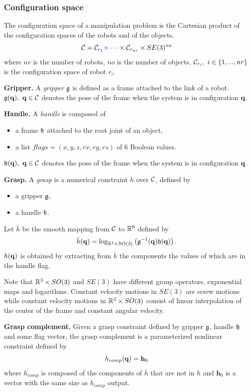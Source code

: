 \subsubsection{Configuration space} The configuration space of a manipulation problem is the Cartesian product of the configuration spaces of the robots and of the objects.
$$
\mathcal{C} = \mathcal{C}_{r_1}{\color{blue}\times\cdots}\times\mathcal{C}_{r_{nr}}\times SE(3)^{no}
$$
where $nr$ is the number of robots, $no$ is the number of objects, $\CS_{r_i},\ i\in\{1,...,nr\}$ is the configuration space of robot $r_i$.
\begin{definition}\textbf{Gripper.}\label{def:gripper}
  A \emph{gripper} $\mathfrak{g}$ is defined as a frame attached to the link of a robot. $\gripper(\conf),\ \conf\in\CS$ denotes the pose of the frame when the system is in configuration $\mathbf{q}$.
\end{definition}
\begin{definition}\textbf{Handle.}\label{def:handle}
  A \emph{handle} is composed of
  \begin{itemize}
  \item a frame $\mathfrak{h}$ attached to the root joint of an object,
  \item a list $flags=(x,y,z,rx,ry,rz)$ of 6 Boolean values.
  \end{itemize}
  $\mathfrak{h}(\mathbf{q}),\ \mathbf{q}\in\mathcal{C}$ denotes the pose of the frame when the system is in configuration $\mathbf{q}$.
\end{definition}
\begin{definition}\textbf{Grasp.}\label{def:grasp}
  A \emph{grasp} is a numerical constraint $h$ over $\mathcal{C}$, defined by
  \begin{itemize}
  \item a gripper $\mathfrak{g}$,
  \item a handle $\mathfrak{h}$.
  \end{itemize}
  Let $\bar{h}$ be the smooth mapping from $\mathcal{C}$ to $\mathbb{R}^6$ defined by
  \begin{equation}\label{eq:barh}
    \bar{h}(\conf) = \log_{\reals^3\times SO(3)}\left(\gripper^{-1}(\conf) \handle(\conf)\right).
  \end{equation}
  $h(\mathbf{q})$ is obtained by extracting from $\bar{h}$ the components the values of which are \true in the handle flag.
\end{definition}
    {\color{blue}Note that $\mathbb{R}^3\times SO(3)$ and $SE(3)$ have
      different group operators, exponential maps and
      logarithms. Constant velocity motions in $SE(3)$ are screw
      motions while constant velocity motions in $\mathbb{R}^3\times
      SO(3)$ consist of linear interpolation of the center of the
      frame and constant angular velocity.}
\begin{definition}\textbf{Grasp complement.}
  Given a grasp constraint defined by gripper $\mathfrak{g}$, handle $\mathfrak{h}$ and some flag vector, the grasp complement is a parameterized nonlinear constraint defined by
  $$
  h_{comp}(\mathbf{q}) = \mathbf{h}_0
  $$
  where $h_{comp}$ is composed of the components of $\bar{h}$ that are not in $h$ and $\mathbf{h}_0$ is a vector with the same size as $h_{comp}$ output.
\end{definition}

